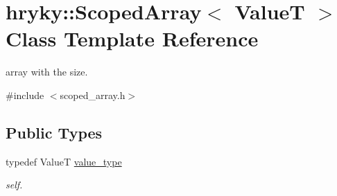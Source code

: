\hypertarget{classhryky_1_1_scoped_array}{\section{hryky\-:\-:Scoped\-Array$<$ Value\-T $>$ Class Template Reference}
\label{classhryky_1_1_scoped_array}
}


array with the size.  




{\ttfamily \#include $<$scoped\-\_\-array.\-h$>$}

\subsection*{Public Types}
\begin{DoxyCompactItemize}
\item 
\hypertarget{classhryky_1_1_scoped_array_ad6d2c3391acaf05f2ced3e6bd6bdf79a}{typedef Value\-T \hyperlink{classhryky_1_1_scoped_array_ad6d2c3391acaf05f2ced3e6bd6bdf79a}{value\-\_\-type}}\label{classhryky_1_1_scoped_array_ad6d2c3391acaf05f2ced3e6bd6bdf79a}

\begin{DoxyCompactList}\small\item\em self. \end{DoxyCompactList}\end{DoxyCompactItemize}

